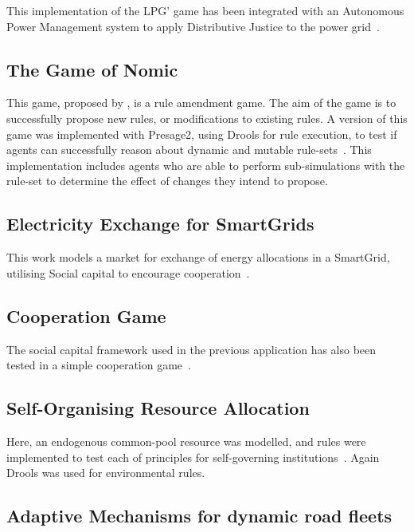 This implementation of the LPG' game has been integrated with an Autonomous
Power Management system to apply Distributive Justice to the power grid~\citep{Kohler2014}.


\subsection{The Game of Nomic}

This game, proposed by \citet{Suber1990}, is a rule amendment game. The aim of
the game is to successfully propose new rules, or modifications to existing
rules. A version of this game was implemented with Presage2, using Drools for
rule execution, to test if agents can successfully reason about dynamic and
mutable rule-sets~\citep{Holland2013}. This implementation includes agents who
are able to perform sub-simulations with the rule-set to determine the effect
of changes they intend to propose.

\subsection{Electricity Exchange for SmartGrids}

This work models a market for exchange of energy allocations in a SmartGrid,
utilising Social capital to encourage cooperation~\citep{Petruzzi2013}.

\subsection{Cooperation Game}

The social capital framework used in the previous application has also been
tested in a simple cooperation game~\citep{Petruzzi2014}.

\subsection{Self-Organising Resource Allocation}

Here, an endogenous common-pool resource was modelled, and rules were
implemented to test each of  principles for
self-governing institutions~\citep{Schaumeier2013}. Again Drools was used for
environmental rules.

\subsection{Adaptive Mechanisms for dynamic road fleets}

